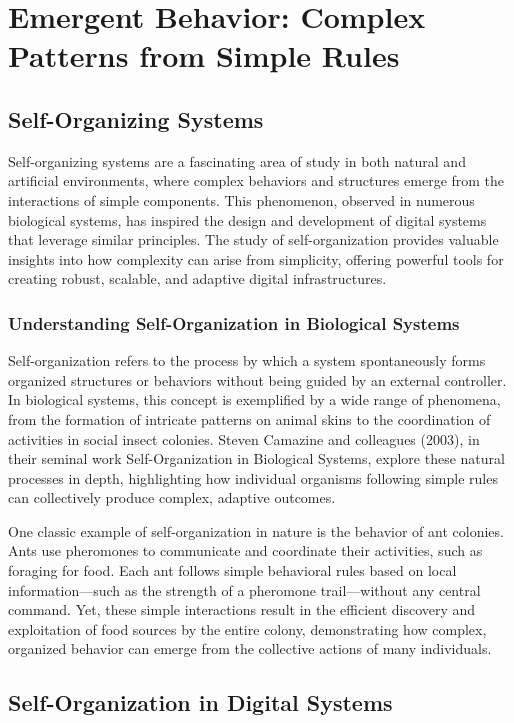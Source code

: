 \documentclass[12pt,twoside]{article}
\begin{document}
\section{Emergent Behavior: Complex Patterns from Simple Rules}

\subsection{Self-Organizing Systems}

Self-organizing systems are a fascinating area of study in both natural and artificial environments, where complex behaviors and structures emerge from the interactions of simple components. This phenomenon, observed in numerous biological systems, has inspired the design and development of digital systems that leverage similar principles. The study of self-organization provides valuable insights into how complexity can arise from simplicity, offering powerful tools for creating robust, scalable, and adaptive digital infrastructures.

\subsubsection{Understanding Self-Organization in Biological Systems}

Self-organization refers to the process by which a system spontaneously forms organized structures or behaviors without being guided by an external controller. In biological systems, this concept is exemplified by a wide range of phenomena, from the formation of intricate patterns on animal skins to the coordination of activities in social insect colonies. Steven Camazine and colleagues (2003), in their seminal work Self-Organization in Biological Systems, explore these natural processes in depth, highlighting how individual organisms following simple rules can collectively produce complex, adaptive outcomes.

One classic example of self-organization in nature is the behavior of ant colonies. Ants use pheromones to communicate and coordinate their activities, such as foraging for food. Each ant follows simple behavioral rules based on local information—such as the strength of a pheromone trail—without any central command. Yet, these simple interactions result in the efficient discovery and exploitation of food sources by the entire colony, demonstrating how complex, organized behavior can emerge from the collective actions of many individuals.

\subsection{Self-Organization in Digital Systems}
\end{document}
